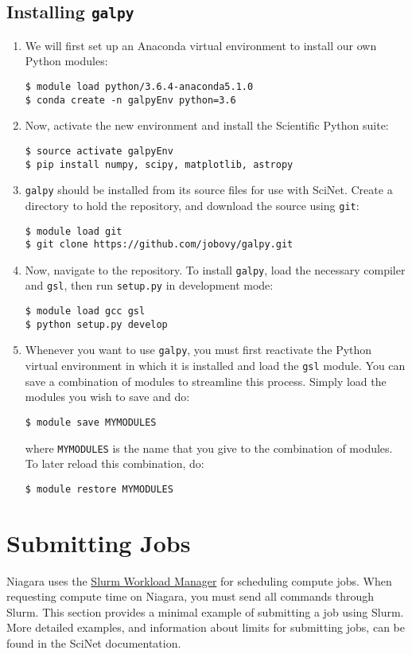 \documentclass[12pt]{article}
\begin{document}
\subsection {Installing \texttt{galpy}}
\begin{enumerate}[leftmargin=*]
\item We will first set up an Anaconda virtual environment to install our own Python modules:
\begin{lstlisting}
$ module load python/3.6.4-anaconda5.1.0
$ conda create -n galpyEnv python=3.6
\end{lstlisting}
\item Now, activate the new environment and install the Scientific Python suite:
\begin{lstlisting}
$ source activate galpyEnv
$ pip install numpy, scipy, matplotlib, astropy
\end{lstlisting}
\item \texttt{galpy} should be installed from its source files for use with SciNet. Create a directory to hold the repository, and download the source using \texttt{git}:
\begin{lstlisting}
$ module load git
$ git clone https://github.com/jobovy/galpy.git
\end{lstlisting}
\item Now, navigate to the repository. To install \texttt{galpy}, load the necessary compiler and \texttt{gsl}, then run \texttt{setup.py} in development mode:
\begin{lstlisting}
$ module load gcc gsl
$ python setup.py develop
\end{lstlisting}
\item Whenever you want to use \texttt{galpy}, you must first reactivate the Python virtual environment in which it is installed and load the \texttt{gsl} module. You can save a combination of modules to streamline this process. Simply load the modules you wish to save and do:
\begin{lstlisting}
$ module save MYMODULES
\end{lstlisting}
where \texttt{MYMODULES} is the name that you give to the combination of modules. To later reload this combination, do:
\begin{lstlisting}
$ module restore MYMODULES
\end{lstlisting}
\end{enumerate}

\section{Submitting Jobs}
Niagara uses the \href{https://docs.scinet.utoronto.ca/index.php/Slurm}{Slurm Workload Manager} for scheduling compute jobs. When requesting compute time on Niagara, you must send all commands through Slurm. This section provides a minimal example of submitting a job using Slurm. More detailed examples, and information about limits for submitting jobs, can be found in the SciNet documentation.
\end{document}
